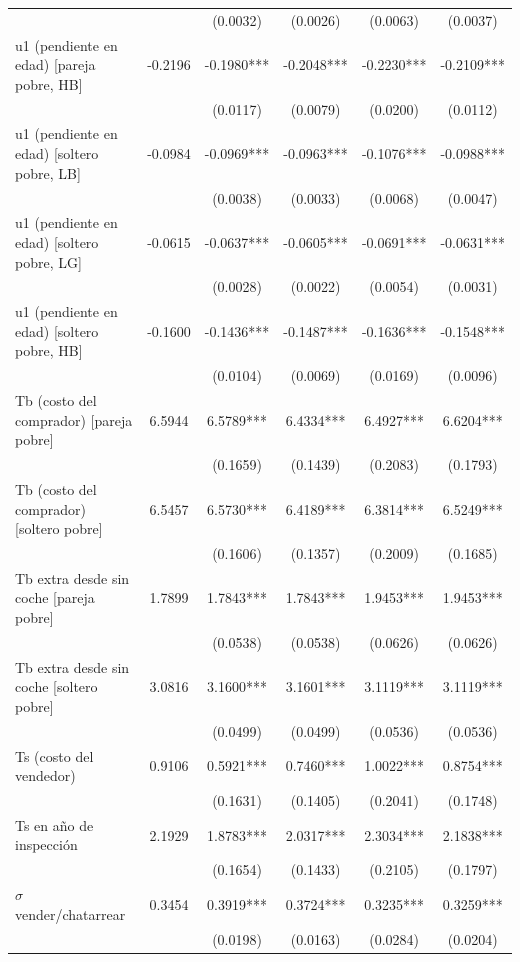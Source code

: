 \begin{table}[htbp]
\begin{tabular}{lccccc}
 &  & (0.0032) & (0.0026) & (0.0063) & (0.0037) \\
u1 (pendiente en edad) [pareja pobre, HB] & -0.2196 & -0.1980*** & -0.2048*** & -0.2230*** & -0.2109*** \\
 &  & (0.0117) & (0.0079) & (0.0200) & (0.0112) \\
u1 (pendiente en edad) [soltero pobre, LB] & -0.0984 & -0.0969*** & -0.0963*** & -0.1076*** & -0.0988*** \\
 &  & (0.0038) & (0.0033) & (0.0068) & (0.0047) \\
u1 (pendiente en edad) [soltero pobre, LG] & -0.0615 & -0.0637*** & -0.0605*** & -0.0691*** & -0.0631*** \\
 &  & (0.0028) & (0.0022) & (0.0054) & (0.0031) \\
u1 (pendiente en edad) [soltero pobre, HB] & -0.1600 & -0.1436*** & -0.1487*** & -0.1636*** & -0.1548*** \\
 &  & (0.0104) & (0.0069) & (0.0169) & (0.0096) \\
Tb (costo del comprador) [pareja pobre] & 6.5944 & 6.5789*** & 6.4334*** & 6.4927*** & 6.6204*** \\
 &  & (0.1659) & (0.1439) & (0.2083) & (0.1793) \\
Tb (costo del comprador) [soltero pobre] & 6.5457 & 6.5730*** & 6.4189*** & 6.3814*** & 6.5249*** \\
 &  & (0.1606) & (0.1357) & (0.2009) & (0.1685) \\
Tb extra desde sin coche [pareja pobre] & 1.7899 & 1.7843*** & 1.7843*** & 1.9453*** & 1.9453*** \\
 &  & (0.0538) & (0.0538) & (0.0626) & (0.0626) \\
Tb extra desde sin coche [soltero pobre] & 3.0816 & 3.1600*** & 3.1601*** & 3.1119*** & 3.1119*** \\
 &  & (0.0499) & (0.0499) & (0.0536) & (0.0536) \\
Ts (costo del vendedor) & 0.9106 & 0.5921*** & 0.7460*** & 1.0022*** & 0.8754*** \\
 &  & (0.1631) & (0.1405) & (0.2041) & (0.1748) \\
Ts en año de inspección & 2.1929 & 1.8783*** & 2.0317*** & 2.3034*** & 2.1838*** \\
 &  & (0.1654) & (0.1433) & (0.2105) & (0.1797) \\
$\sigma$ vender/chatarrear & 0.3454 & 0.3919*** & 0.3724*** & 0.3235*** & 0.3259*** \\
 &  & (0.0198) & (0.0163) & (0.0284) & (0.0204) \\

\end{tabular}
\end{table}
